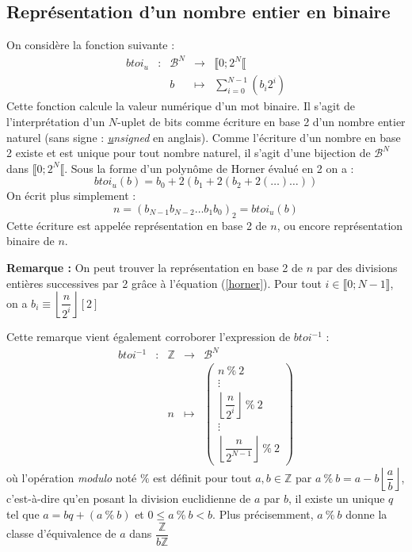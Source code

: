 \documentclass[../../main.tex]{subfiles}
\begin{document}
\subsection{Représentation d'un nombre entier en binaire} \label{sub:repr_sentation_d_un_nombre_entier_en_binaire}
On considère la fonction suivante :
$$
\begin{array}{lclcl}
btoi_{u} & : & \mathcal{B}^{N} & \rightarrow & \llbracket 0; 2^{N}\llbracket \\
     &   & b & \mapsto & \displaystyle\sum_{i = 0}^{N-1}(b_{i}2^{i})
\end{array}
$$
Cette fonction calcule la valeur numérique d'un mot binaire. Il s'agit de l'interprétation d'un $N$-uplet de bits comme écriture en base 2 d'un nombre entier naturel (sans signe : \textit{\underline{u}nsigned} en anglais). Comme l'écriture d'un nombre en base 2 existe et est unique pour tout nombre naturel, il s'agit d'une bijection de $\mathcal{B}^{N}$ dans $\llbracket 0; 2^{N}\llbracket $. \newline
Sous la forme d'un polynôme de Horner évalué en 2 on a :
\begin{equation}\label{horner}
btoi_{u}(b) = b_{0} + 2(b_{1} + 2(b_{2} + 2(\dots)\dots))
\end{equation}
On écrit plus simplement :
$$n = (b_{N-1}b_{N-2}\dots b_{1}b_{0})_{2} = btoi_{u}(b)$$
Cette écriture est appelée représentation en base 2 de $n$, ou encore représentation binaire de $n$.

\textbf{Remarque :} On peut trouver la représentation en base 2 de $n$ par des divisions entières successives par 2 grâce à l'équation (\ref{horner}). Pour tout $i\in{\llbracket{0; N-1}\rrbracket}$, on a $b_{i} \equiv{\left\lfloor{\dfrac{n}{2^{i}}}\right\rfloor{[2]}}$ 

Cette remarque vient également corroborer l'expression de $btoi^{-1}$ :
$$
\begin{array}{lclcl}
btoi^{-1} & : & \mathbb{Z} & \rightarrow & \mathcal{B}^{N} \\
     &   & n & \mapsto & \begin{pmatrix}
n\ \%\ 2 \\
\vdots \\
\left\lfloor\dfrac{n}{2^{i}}\right\rfloor\ \%\ 2 \\
\vdots \\
\left\lfloor\dfrac{n}{2^{N-1}}\right\rfloor\ \%\ 2
\end{pmatrix}
\end{array}
$$
où l'opération \textit{modulo} noté $\%$ est définit pour tout $a, b\in{\mathbb{Z}}$ par $a\ \%\ b = a - b\left\lfloor\dfrac{a}{b}\right\rfloor$, c'est-à-dire qu'en posant la division euclidienne de $a$ par $b$, il existe un unique $q$ tel que $a = bq + (a\ \%\ b)$ et $0 \leq a\ \%\ b < b$.\newline
Plus précisemment, $a\ \%\ b$ donne la classe d'équivalence de $a$ dans $\dfrac{\mathbb{Z}}{b\mathbb{Z}}$
\end{document}
